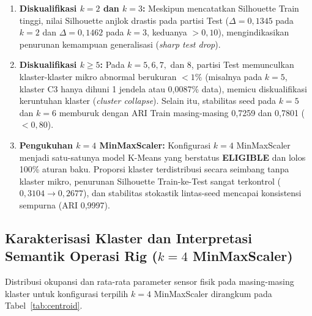 \documentclass[conference]{IEEEtran}
\begin{document}
\begin{enumerate}
\item \textbf{Diskualifikasi $k = 2$ dan $k = 3$:} Meskipun mencatatkan Silhouette Train tinggi, nilai Silhouette anjlok drastis pada partisi Test ($\Delta = 0,1345$ pada $k=2$ dan $\Delta = 0,1462$ pada $k=3$, keduanya $> 0,10$), mengindikasikan penurunan kemampuan generalisasi (\textit{sharp test drop}).

\item \textbf{Diskualifikasi $k \ge 5$:} Pada $k = 5, 6, 7,$ dan $8$, partisi Test memunculkan klaster-klaster mikro abnormal berukuran $< 1\%$ (misalnya pada $k=5$, klaster C3 hanya dihuni 1 jendela atau 0,0087\% data), memicu diskualifikasi keruntuhan klaster (\textit{cluster collapse}). Selain itu, stabilitas seed pada $k=5$ dan $k=6$ memburuk dengan ARI Train masing-masing 0,7259 dan 0,7801 ($< 0,80$).

\item \textbf{Pengukuhan $k = 4$ MinMaxScaler:} Konfigurasi $k = 4$ MinMaxScaler menjadi satu-satunya model K-Means yang berstatus \textbf{ELIGIBLE} dan lolos 100\% aturan baku. Proporsi klaster terdistribusi secara seimbang tanpa klaster mikro, penurunan Silhouette Train-ke-Test sangat terkontrol ($0,3104 \rightarrow 0,2677$), dan stabilitas stokastik lintas-seed mencapai konsistensi sempurna (ARI 0,9997).
\end{enumerate}

\subsection{Karakterisasi Klaster dan Interpretasi Semantik Operasi Rig ($k=4$ MinMaxScaler)}
Distribusi okupansi dan rata-rata parameter sensor fisik pada masing-masing klaster untuk konfigurasi terpilih $k=4$ MinMaxScaler dirangkum pada Tabel~\ref{tab:centroid}.
\end{document}
